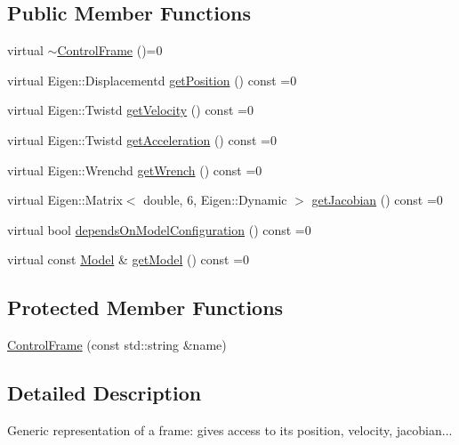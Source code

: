 \subsection*{Public Member Functions}
\begin{DoxyCompactItemize}
\item 
virtual \hyperlink{classocra_1_1ControlFrame_abfbbf55462bf1b256f12316ae3abe357}{$\sim$\+Control\+Frame} ()=0
\item 
virtual Eigen\+::\+Displacementd \hyperlink{classocra_1_1ControlFrame_aaadbbfbcdd5b8e197a0f181ffb2fdcbe}{get\+Position} () const =0
\item 
virtual Eigen\+::\+Twistd \hyperlink{classocra_1_1ControlFrame_a398df839f75886867c86a8e70ac9bf24}{get\+Velocity} () const =0
\item 
virtual Eigen\+::\+Twistd \hyperlink{classocra_1_1ControlFrame_a0ceb7cd7c3fe90fa0ef311b96a6f5c88}{get\+Acceleration} () const =0
\item 
virtual Eigen\+::\+Wrenchd \hyperlink{classocra_1_1ControlFrame_a069aaf1eab98598fbffee263fcde0c56}{get\+Wrench} () const =0
\item 
virtual Eigen\+::\+Matrix$<$ double, 6, Eigen\+::\+Dynamic $>$ \hyperlink{classocra_1_1ControlFrame_a14e0b855979be5dbd360314f25191e77}{get\+Jacobian} () const =0
\item 
virtual bool \hyperlink{classocra_1_1ControlFrame_a65833d1f3f42bc8d452f8b1fb671e142}{depends\+On\+Model\+Configuration} () const =0
\item 
virtual const \hyperlink{classocra_1_1Model}{Model} \& \hyperlink{classocra_1_1ControlFrame_ab8a1e5e3d96d7524112b4c88bf0bc5ee}{get\+Model} () const =0
\end{DoxyCompactItemize}
\subsection*{Protected Member Functions}
\begin{DoxyCompactItemize}
\item 
\hyperlink{classocra_1_1ControlFrame_a8ce978cbe6393c6baa232826c48aec55}{Control\+Frame} (const std\+::string \&name)
\end{DoxyCompactItemize}


\subsection{Detailed Description}
Generic representation of a frame\+: gives access to its position, velocity, jacobian... 

